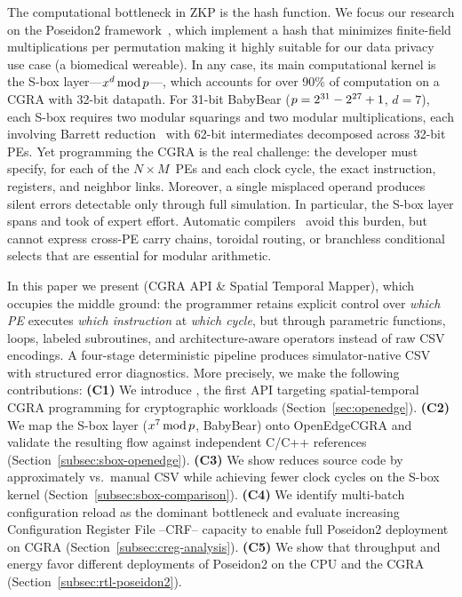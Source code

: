 The computational bottleneck in ZKP is the hash function. We focus our research on the Poseidon2 framework~\cite{poseidon2}, which implement a hash that minimizes finite-field multiplications per permutation making it highly suitable for our data privacy use case (a biomedical wereable). In any case, its main computational kernel is the S-box layer---$x^d \operatorname{mod} p$---, which accounts for over 90\% of computation on a CGRA with 32-bit datapath. For 31-bit BabyBear ($p = 2^{31} - 2^{27} + 1$, $d\!=\!7$), each S-box requires two modular squarings and two modular multiplications, each involving Barrett reduction~\cite{barrett1986} with 62-bit intermediates decomposed across 32-bit PEs. Yet programming the CGRA is the real challenge: the developer must specify, for each of the $N\times M$~PEs and each clock cycle, the exact instruction, registers, and neighbor links. Moreover, a single misplaced operand produces silent errors detectable only through full simulation. In particular, the S-box layer  spans \lines{\MetricLocManual} and took \MetricSboxKernelManualAuthoringTime{} of expert effort. Automatic compilers~\cite{compigra,wang2025mlir} avoid this burden, but cannot express cross-PE carry chains, toroidal routing, or branchless conditional selects that are essential for modular arithmetic.

In this paper we present \castm{} (CGRA API \& Spatial Temporal Mapper),
which occupies the middle ground: the programmer retains explicit control over \emph{which PE} executes \emph{which instruction} at \emph{which cycle}, but through parametric functions, loops, labeled subroutines, and architecture-aware operators instead of raw CSV encodings. A four-stage deterministic pipeline
produces simulator-native CSV with structured error diagnostics. More precisely, we make the following contributions: \textbf{(C1)} We introduce \castm{}, the first API targeting spatial-temporal CGRA programming for cryptographic workloads (Section~\ref{sec:openedge}).
\textbf{(C2)} We map the S-box layer ($x^7 \operatorname{mod} p$, BabyBear) onto OpenEdgeCGRA and validate the resulting flow against independent C/C++ references (Section~\ref{subsec:sbox-openedge}). \textbf{(C3)} We show \castm{} reduces source code by approximately \timex{\MetricLocCompressionVsManual} vs.\ manual CSV while achieving \pct{\MetricSboxCastmCycleReductionPct} fewer clock cycles on the S-box kernel (Section~\ref{subsec:sbox-comparison}). \textbf{(C4)} We identify multi-batch configuration reload as the dominant bottleneck and evaluate increasing Configuration Register File --CRF-- capacity to enable full Poseidon2 deployment on CGRA (Section~\ref{subsec:creg-analysis}). \textbf{(C5)} We show that throughput and energy favor different deployments of Poseidon2 on the CPU and the CGRA (Section~\ref{subsec:rtl-poseidon2}).
